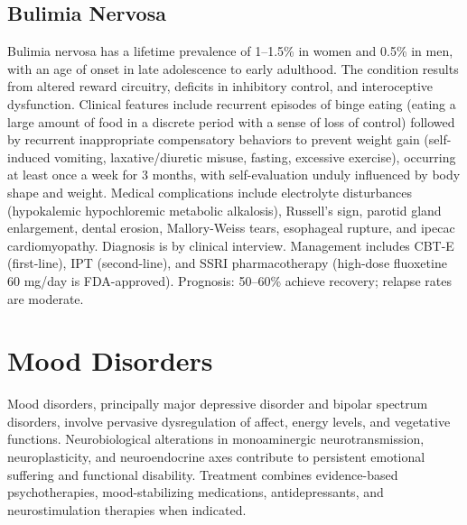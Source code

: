 \subsection{Bulimia Nervosa}
\label{sec:Bulimia Nervosa}
Bulimia nervosa has a lifetime prevalence of 1--1.5\% in women and 0.5\% in men, with an age of onset in late adolescence to early adulthood. The condition results from altered reward circuitry, deficits in inhibitory control, and interoceptive dysfunction. Clinical features include recurrent episodes of binge eating (eating a large amount of food in a discrete period with a sense of loss of control) followed by recurrent inappropriate compensatory behaviors to prevent weight gain (self-induced vomiting, laxative/diuretic misuse, fasting, excessive exercise), occurring at least once a week for 3 months, with self-evaluation unduly influenced by body shape and weight. Medical complications include electrolyte disturbances (hypokalemic hypochloremic metabolic alkalosis), Russell's sign, parotid gland enlargement, dental erosion, Mallory-Weiss tears, esophageal rupture, and ipecac cardiomyopathy. Diagnosis is by clinical interview. Management includes CBT-E (first-line), IPT (second-line), and SSRI pharmacotherapy (high-dose fluoxetine 60 mg/day is FDA-approved). Prognosis: 50--60\% achieve recovery; relapse rates are moderate.

\section{Mood Disorders}




Mood disorders, principally major depressive disorder and bipolar spectrum disorders, involve pervasive dysregulation of affect, energy levels, and vegetative functions. Neurobiological alterations in monoaminergic neurotransmission, neuroplasticity, and neuroendocrine axes contribute to persistent emotional suffering and functional disability. Treatment combines evidence-based psychotherapies, mood-stabilizing medications, antidepressants, and neurostimulation therapies when indicated.

